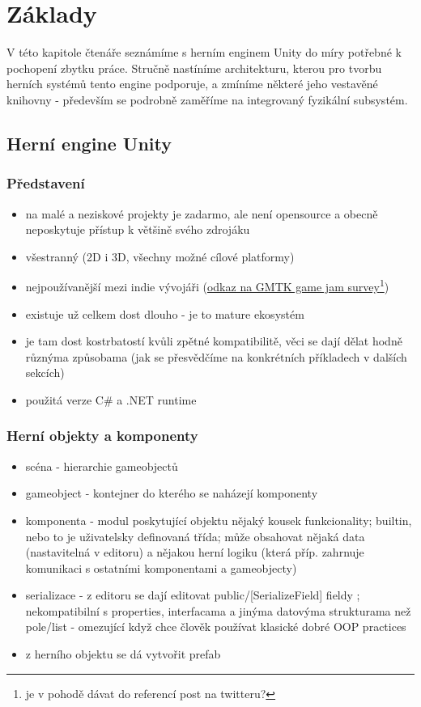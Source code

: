 \chapter{Základy}

V této kapitole čtenáře seznámíme s herním enginem Unity do míry potřebné k pochopení zbytku práce. Stručně nastíníme architekturu, kterou pro tvorbu herních systémů tento engine podporuje, a zmíníme některé jeho vestavěné knihovny - především se podrobně zaměříme na integrovaný fyzikální subsystém.


\section{Herní engine Unity}

\subsection{Představení}    \label{unityEngineIntroSection}
\begin{itemize}
    \item na malé a neziskové projekty je zadarmo, ale není opensource a obecně neposkytuje přístup k většině svého zdrojáku
    \item všestranný (2D i 3D, všechny možné cílové platformy)
    \item nejpoužívanější mezi indie vývojáři (\href{https://twitter.com/gamemakerstk/status/1552183527847989248?cxt=HHwWgMC8ubusu4orAAAA}{odkaz na GMTK game jam survey}\footnote{je v pohodě dávat do referencí post na twitteru?})
    \item existuje už celkem dost dlouho - je to mature ekosystém%
    \item je tam dost kostrbatostí kvůli zpětné kompatibilitě, věci se dají dělat hodně různýma způsobama (jak se přesvědčíme na konkrétních příkladech v dalších sekcích)
    \item použitá verze C\# a .NET runtime
\end{itemize}

\subsection{Herní objekty a komponenty}
\begin{itemize}
    \item scéna - hierarchie gameobjectů
    \item gameobject - kontejner do kterého se naházejí komponenty
    \item komponenta - modul poskytující objektu nějaký kousek funkcionality; builtin, nebo to je uživatelsky definovaná třída; může obsahovat nějaká data (nastavitelná v editoru) a nějakou herní logiku (která příp. zahrnuje komunikaci s ostatními komponentami a gameobjecty)
    \item serializace - z editoru se dají editovat public/[SerializeField] fieldy ; nekompatibilní s properties, interfacama a jinýma datovýma strukturama než pole/list - omezující když chce člověk používat klasické dobré OOP practices  
    \item z herního objektu se dá vytvořit prefab
\end{itemize}


